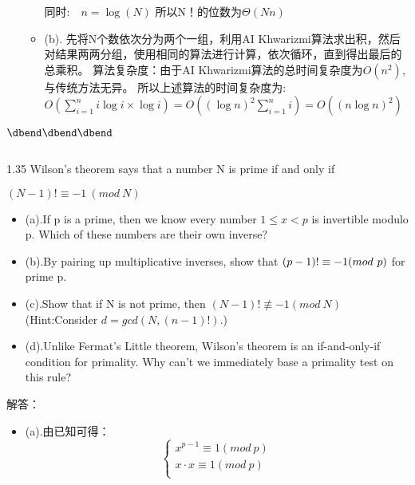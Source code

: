\documentclass[11pt,a4paper]{article}
\begin{document}
\begin{CJK*}{UTF8}{gbsn}
\begin{enumerate}
\begin{itemize}
		同时:\ \ $n=\log(N)$\newline
		所以N！的位数为$\Theta(Nn)$
		\item (b). 先将N个数依次分为两个一组，利用AI Khwarizmi算法求出积，然后对结果两两分组，使用相同的算法进行计算，依次循环，直到得出最后的总乘积。\newline
		算法复杂度：由于AI Khwarizmi算法的总时间复杂度为$O(n^2)$, 与传统方法无异。\newline
		所以上述算法的时间复杂度为: \newline
		$O(\sum_{i=1}^{n}i\log i\times\log i)=O((\log n)^2\sum_{i=1}^{n}i)=O((n\log n)^2)$
	\end{itemize}
\end{enumerate}
\begin{flushleft}
$\vbox{\hbox{\dbend\dbend\dbend}\vskip 11pt}$
\end{flushleft}
1.35 Wilson's theorem says that a number N is prime if and only if\newline
\begin{center}
$(N-1)!\equiv -1\ (mod\ N)$
\end{center}
\flushleft
\begin{enumerate}
	\begin{itemize}
		\item(a).If p is a prime, then we know every number $1\leq x<p$ is invertible modulo p. Which of these numbers are their own inverse?
		\item(b).By pairing up multiplicative inverses, show that $(p-1)!\newline \equiv -1(mod\ p)$ for prime p.
		\item(c).Show that if N is not prime, then $(N-1)!\not \equiv -1(mod\ N)$\newline(Hint:Consider $d=gcd(N,(n-1)!)$.)
		\item(d).Unlike Fermat's Little theorem, Wilson's theorem is an if-and-only-if condition for primality. Why can't we immediately base a primality test on this rule?
	\end{itemize}
\end{enumerate}
\begin{enumerate}
解答：
	\begin{itemize}
		\item(a).由已知可得：
		\begin{displaymath}
			\left\{ \begin{array}{ll}
			x^{p-1}\equiv 1(mod\ p)\\
			x\cdot x\equiv 1(mod\ p)\\

\end{array}
\end{displaymath}
\end{itemize}
\end{enumerate}
\end{CJK*}
\end{document}
